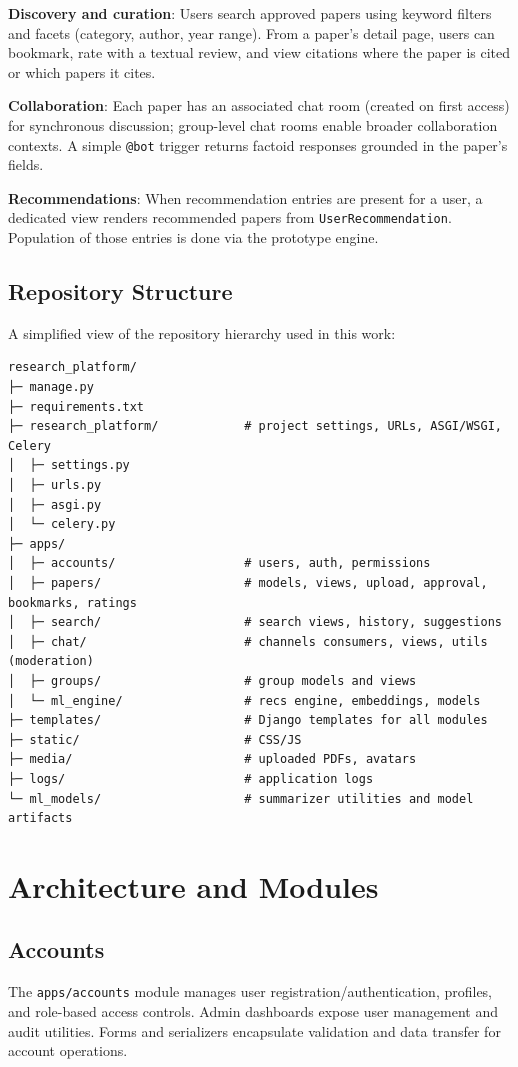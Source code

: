 \documentclass[conference]{IEEEtran}
\begin{document}
\textbf{Discovery and curation}: Users search approved papers using keyword filters and facets (category, author, year range). From a paper's detail page, users can bookmark, rate with a textual review, and view citations where the paper is cited or which papers it cites.

\textbf{Collaboration}: Each paper has an associated chat room (created on first access) for synchronous discussion; group-level chat rooms enable broader collaboration contexts. A simple \texttt{@bot} trigger returns factoid responses grounded in the paper's fields.

\textbf{Recommendations}: When recommendation entries are present for a user, a dedicated view renders recommended papers from \texttt{UserRecommendation}. Population of those entries is done via the prototype engine.

\subsection{Repository Structure}
\noindent A simplified view of the repository hierarchy used in this work:
\begin{lstlisting}
research_platform/
├─ manage.py
├─ requirements.txt
├─ research_platform/            # project settings, URLs, ASGI/WSGI, Celery
│  ├─ settings.py
│  ├─ urls.py
│  ├─ asgi.py
│  └─ celery.py
├─ apps/
│  ├─ accounts/                  # users, auth, permissions
│  ├─ papers/                    # models, views, upload, approval, bookmarks, ratings
│  ├─ search/                    # search views, history, suggestions
│  ├─ chat/                      # channels consumers, views, utils (moderation)
│  ├─ groups/                    # group models and views
│  └─ ml_engine/                 # recs engine, embeddings, models
├─ templates/                    # Django templates for all modules
├─ static/                       # CSS/JS
├─ media/                        # uploaded PDFs, avatars
├─ logs/                         # application logs
└─ ml_models/                    # summarizer utilities and model artifacts
\end{lstlisting}

\section{Architecture and Modules}
\subsection{Accounts}
The \texttt{apps/accounts} module manages user registration/authentication, profiles, and role-based access controls. Admin dashboards expose user management and audit utilities. Forms and serializers encapsulate validation and data transfer for account operations.
\end{document}
